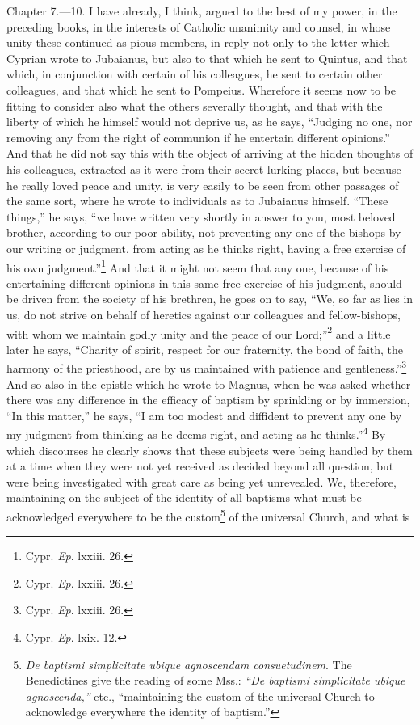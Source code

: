 
Chapter 7.—10. I have already, I think, argued to the best of my power, in the preceding books, in the interests of Catholic unanimity and counsel, in whose unity these continued as pious members, in reply not only to the letter which Cyprian wrote to Jubaianus, but also to that which he sent to Quintus, and that which, in conjunction with certain of his colleagues, he sent to certain other colleagues, and that which he sent to Pompeius. Wherefore it seems now to be fitting to consider also what the others severally thought, and that with the liberty of which he himself would not deprive us, as he says, ``Judging no one, nor removing any from the right of communion if he entertain different opinions.'' And that he did not say this with the object of arriving at the hidden thoughts of his colleagues, extracted as it were from their secret lurking-places, but because he really loved peace and unity, is very easily to be seen from other passages of the same sort, where he wrote to individuals as to Jubaianus himself. ``These things,'' he says, ``we have written very shortly in answer to you, most beloved brother, according to our poor ability, not preventing any one of the bishops by our writing or judgment, from acting as he thinks right, having a free exercise of his own judgment.''\footnote{\par  Cypr. \emph{Ep}. lxxiii. 26.} And that it might not seem that any one, because of his entertaining different opinions in this same free exercise of his judgment, should be driven from the society of his brethren, he goes on to say, ``We, so far as lies in us, do not strive on behalf of heretics against our colleagues and fellow-bishops, with whom we maintain godly unity and the peace of our Lord;''\footnote{\par  Cypr. \emph{Ep}. lxxiii. 26.} and a little later he says, ``Charity of spirit, respect for our fraternity, the bond of faith, the harmony of the priesthood, are by us maintained with patience and gentleness.''\footnote{\par  Cypr. \emph{Ep}. lxxiii. 26.} And so also in the epistle which he wrote to Magnus, when he was asked whether there was any difference in the efficacy of baptism by sprinkling or by immersion, ``In this matter,'' he says, ``I am too modest and diffident to prevent any one by my judgment from thinking as he deems right, and acting as he thinks.''\footnote{\par  Cypr. \emph{Ep}. lxix. 12.} By which discourses he clearly shows that these subjects were being handled by them at a time when they were not yet received as decided beyond all question, but were being investigated with great care as being yet unrevealed. We, therefore, maintaining on the subject of the identity of all baptisms what must be acknowledged everywhere to be the custom\footnote{\par  \emph{De baptismi simplicitate ubique agnoscendam consuetudinem}. The Benedictines give the reading of some Mss.: \emph{``De baptismi simplicitate ubique agnoscenda,''} etc., ``maintaining the custom of the universal Church to acknowledge everywhere the identity of baptism.''} of the universal Church, and what is 